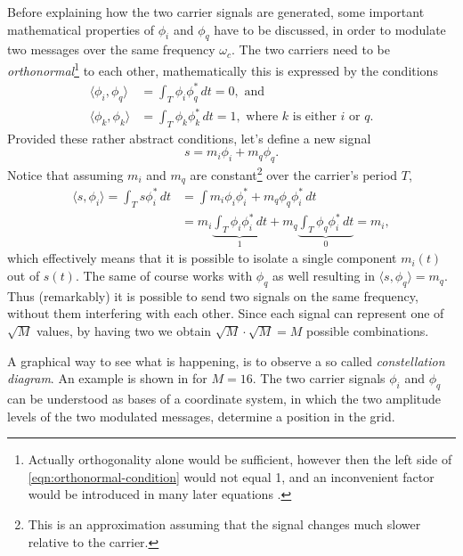 Before explaining how the two carrier signals are generated, some important mathematical properties of \(\phi_i\) and \(\phi_q\) have to be discussed, in order to modulate two messages over the same frequency \(\omega_c\). The two carriers need to be \emph{orthonormal}\footnote{Actually orthogonality alone would be sufficient, however then the left side of \eqref{eqn:orthonormal-condition} would not equal 1, and an inconvenient factor would be introduced in many later equations \cite{Gallager,Hsu}.} to each other, mathematically this is expressed by the conditions \cite{Gallager}
\begin{subequations} \label{eqn:orthonormal-conditions}
	\begin{align}
		\langle \phi_i, \phi_q \rangle
			&= \int_T \phi_i \phi_q^* \, dt
			= 0, \text{ and } \label{eqn:orthogonal-condition} \\
		\langle \phi_k, \phi_k \rangle
			&= \int_T \phi_k \phi_k^*  \,dt = 1,
			\text{ where } k \text{ is either } i \text{ or } q. \label{eqn:orthonormal-condition}
	\end{align}
\end{subequations}
Provided these rather abstract conditions, let's define a new signal 
\begin{equation}
	s = m_i\phi_i + m_q\phi_q.
\end{equation}
Notice that assuming \(m_i\) and \(m_q\) are constant\footnote{This is an approximation assuming that the signal changes much slower relative to the carrier.} over the carrier's period \(T\),
\begin{align*}
	\langle s, \phi_i \rangle = \int_T s \phi_i^* \,dt
		&= \int m_i \phi_i \phi_i^* + m_q \phi_q \phi_i^* \,dt \\
		&= m_i \underbrace{\int_T \phi_i \phi_i^* \,dt}_{1}
			+ m_q \underbrace{\int_T \phi_q \phi_i^* \,dt}_{0} = m_i,
\end{align*}
which effectively means that it is possible to isolate a single component \(m_i(t)\) out of \(s(t)\). The same of course works with \(\phi_q\) as well resulting in \(\langle s, \phi_q \rangle = m_q\). Thus (remarkably) it is possible to send two signals on the same frequency, without them interfering with each other. Since each signal can represent one of \(\sqrt{M}\) values, by having two we obtain \(\sqrt{M} \cdot \sqrt{M} = M\) possible combinations.

A graphical way to see what is happening, is to observe a so called \emph{constellation diagram}. An example is shown in  for \(M = 16\). The two carrier signals \(\phi_i\) and \(\phi_q\) can be understood as bases of a coordinate system, in which the two amplitude levels of the two modulated messages, determine a position in the grid.

